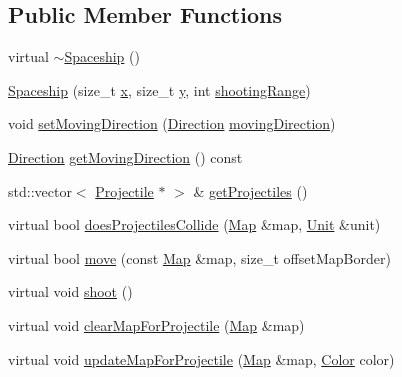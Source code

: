 \subsection*{Public Member Functions}
\begin{DoxyCompactItemize}
\item 
virtual \hyperlink{classarcade_1_1_spaceship_ada9cb897bb55ceff50c40228c8307f66}{$\sim$\+Spaceship} ()
\item 
\hyperlink{classarcade_1_1_spaceship_ab9d51b5b611dc512b4e098a6356c8903}{Spaceship} (size\+\_\+t \hyperlink{include_2_protocol_8hpp_a4dde988b1b2adba65ae3efa69f65d960}{x}, size\+\_\+t \hyperlink{include_2_protocol_8hpp_ab0580f504a7428539be299fa71565f30}{y}, int \hyperlink{classarcade_1_1_spaceship_a414281f267135317527aeb86e170d892}{shooting\+Range})
\item 
void \hyperlink{classarcade_1_1_spaceship_aac1226902cf4345e7dc5b91dd6fdf1a4}{set\+Moving\+Direction} (\hyperlink{classarcade_1_1_unit_af418afeaba1f7fd5934b6ae1343215dd}{Direction} \hyperlink{classarcade_1_1_spaceship_a0ac1911c03d0f728e70fca2a9ae01ab2}{moving\+Direction})
\item 
\hyperlink{classarcade_1_1_unit_af418afeaba1f7fd5934b6ae1343215dd}{Direction} \hyperlink{classarcade_1_1_spaceship_a3c768c9647ac59db68f278c1c9cb9f03}{get\+Moving\+Direction} () const
\item 
std\+::vector$<$ \hyperlink{classarcade_1_1_projectile}{Projectile} $\ast$ $>$ \& \hyperlink{classarcade_1_1_spaceship_a3f45b690df3d418a89b042ec12627feb}{get\+Projectiles} ()
\item 
virtual bool \hyperlink{classarcade_1_1_spaceship_a2f13ff685814d14efad398b3564c7646}{does\+Projectiles\+Collide} (\hyperlink{classarcade_1_1_map}{Map} \&map, \hyperlink{classarcade_1_1_unit}{Unit} \&unit)
\item 
virtual bool \hyperlink{classarcade_1_1_spaceship_a2142187204afe7429d4383471769a414}{move} (const \hyperlink{classarcade_1_1_map}{Map} \&map, size\+\_\+t offset\+Map\+Border)
\item 
virtual void \hyperlink{classarcade_1_1_spaceship_a3cac44ed8029c675de7df8dbbff545b4}{shoot} ()
\item 
virtual void \hyperlink{classarcade_1_1_spaceship_aa6a5b59bdb64be086b212847e752b02c}{clear\+Map\+For\+Projectile} (\hyperlink{classarcade_1_1_map}{Map} \&map)
\item 
virtual void \hyperlink{classarcade_1_1_spaceship_acc24a4ca8532c59d2cfb768cae629d8e}{update\+Map\+For\+Projectile} (\hyperlink{classarcade_1_1_map}{Map} \&map, \hyperlink{unionarcade_1_1_color}{Color} color)

\end{DoxyCompactItemize}
